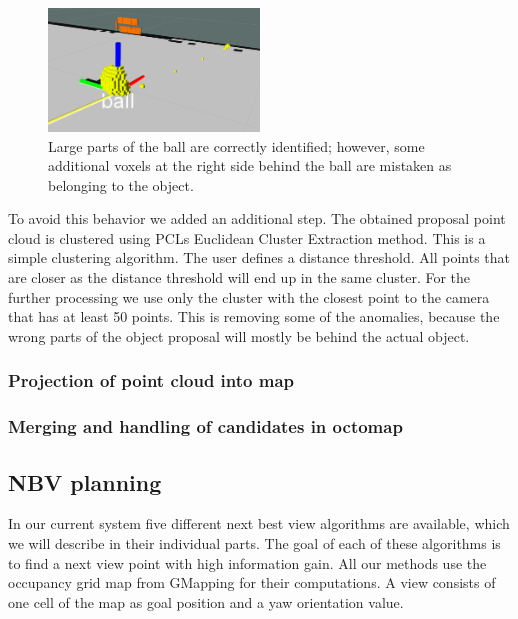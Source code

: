 \documentclass[a4paper,11pt,english]{article}
\begin{document}
\begin{figure}[h!]
	\begin{center}
		\includegraphics[width=0.5\textwidth]{src/rays2.png}
		\caption{Large parts of the ball are correctly identified; however, some additional voxels at the right side behind the ball are mistaken as belonging to the object.}
		\label{fig:rays}
	\end{center}
\end{figure}

To avoid this behavior we added an additional step. 
The obtained proposal point cloud is clustered using PCLs Euclidean Cluster Extraction method.
This is a simple clustering algorithm.
The user defines a distance threshold.
All points that are closer as the distance threshold will end up in the same cluster.
For the further processing we use only the cluster with the closest point to the camera that has at least 50 points.
This is removing some of the anomalies, because the wrong parts of the object proposal will mostly be behind the actual object.

\subsubsection{Projection of point cloud into map}

\subsubsection{Merging and handling of candidates in octomap}

\subsection{NBV planning}
In our current system five different next best view algorithms are available, which we will describe in their individual parts.
The goal of each of these algorithms is to find a next view point with high information gain.
All our methods use the occupancy grid map from GMapping for their computations.
A view consists of one cell of the map as goal position and a yaw orientation value.
\end{document}
